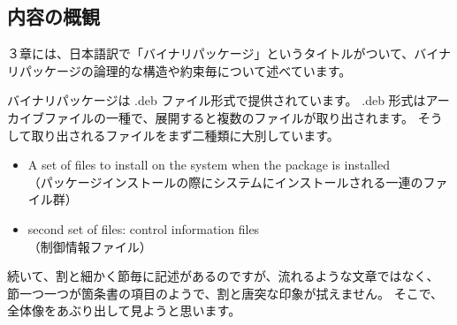 \documentclass[mingoth,a4paper]{jsarticle}
\begin{document}

\subsection{内容の概観}
３章には、日本語訳で「バイナリパッケージ」というタイトルがついて、バイナリパッケージの論理的な構造や約束毎について述べています。

バイナリパッケージは .deb ファイル形式で提供されています。
.deb 形式はアーカイブファイルの一種で、展開すると複数のファイルが取り出されます。
そうして取り出されるファイルをまず二種類に大別しています。

\begin{itemize}
\item A set of files to install on the system when the package is installed \\
  （パッケージインストールの際にシステムにインストールされる一連のファイル群）
\item second set of files: control information files \\
  （制御情報ファイル）
\end{itemize}

続いて、割と細かく節毎に記述があるのですが、流れるような文章ではなく、 節一つ一つが箇条書の項目のようで、割と唐突な印象が拭えません。
そこで、全体像をあぶり出して見ようと思います。
\end{document}
